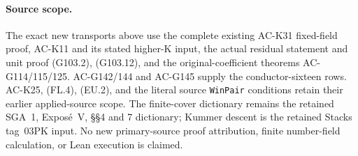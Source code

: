 \paragraph{Source scope.}
The exact new transports above use the complete existing AC-K31
fixed-field proof, AC-K11 and its stated higher-K input,
the actual residual statement and unit proof (G103.2), (G103.12),
and the original-coefficient theorems AC-G114/115/125.
AC-G142/144 and AC-G145 supply the conductor-sixteen rows.
AC-K25, (FL.4), (EU.2), and the literal source \texttt{WinPair}
conditions retain their earlier applied-source scope.
The finite-cover dictionary remains the retained SGA~1,
Expos\'e~V, \S\S4 and 7 dictionary; Kummer descent is the
retained Stacks tag~03PK input.
No new primary-source proof attribution, finite number-field
calculation, or Lean execution is claimed.
